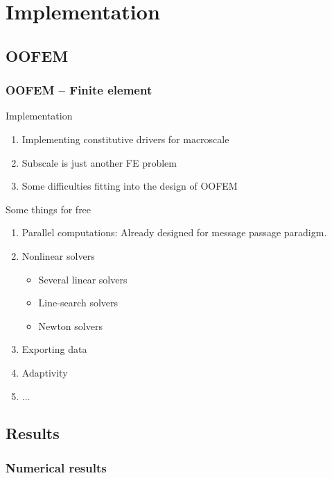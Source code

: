 \documentclass[11pt,mathserif]{beamer}
\begin{document}
\section{Implementation}
\subsection{OOFEM}
\begin{frame}
 \frametitle{OOFEM -- Finite element }
 Implementation
 \begin{enumerate}
  \item Implementing constitutive drivers for macroscale
  \item Subscale is just another FE problem
  \item Some difficulties fitting into the design of OOFEM
 \end{enumerate}

 Some things for free
 \begin{enumerate}
  \item<2-> Parallel computations: Already designed for message passage paradigm.
  \item<2-> Nonlinear solvers
  \begin{itemize}
   \item<2-> Several linear solvers
   \item<2-> Line-search solvers
   \item<2-> Newton solvers
  \end{itemize}
  \item<2-> Exporting data
  \item<2-> Adaptivity
  \item<2-> $\dots$
 \end{enumerate}

\end{frame}

\subsection{Results}
\begin{frame}
 \frametitle{Numerical results}
\begin{center}

\end{center}
\end{frame}
\end{document}
